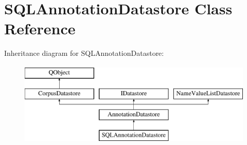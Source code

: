 \hypertarget{class_s_q_l_annotation_datastore}{}\section{S\+Q\+L\+Annotation\+Datastore Class Reference}
\label{class_s_q_l_annotation_datastore}
Inheritance diagram for S\+Q\+L\+Annotation\+Datastore\+:\begin{figure}[H]
\begin{center}
\leavevmode
\includegraphics[height=4.000000cm]{class_s_q_l_annotation_datastore}
\end{center}
\end{figure}

